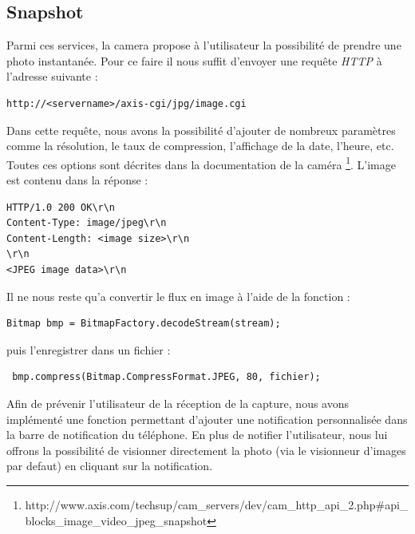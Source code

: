 \subsection{Snapshot}
Parmi ces services, la camera propose à l'utilisateur la possibilité de
prendre une photo instantanée. \newline
Pour ce faire il nous suffit d'envoyer une requête \textit{HTTP} à l'adresse
suivante : 
\begin{lstlisting}
http://<servername>/axis-cgi/jpg/image.cgi
\end{lstlisting}
Dans cette requête, nous avons la possibilité d'ajouter de nombreux paramètres
comme la résolution, le taux de compression, l'affichage de la date, l'heure,
etc. Toutes ces options sont décrites dans la documentation de la caméra
\footnote{\label{MjpegView}http://www.axis.com/techsup/cam\_servers/dev/cam\_http\_api\_2.php\#api\_blocks\_image\_video\_jpeg\_snapshot}.
L'image est contenu dans la réponse :
\begin{lstlisting}
HTTP/1.0 200 OK\r\n
Content-Type: image/jpeg\r\n
Content-Length: <image size>\r\n
\r\n
<JPEG image data>\r\n
\end{lstlisting}
Il ne nous reste qu'a convertir le flux en image
à l'aide de la fonction :
\begin{lstlisting}
Bitmap bmp = BitmapFactory.decodeStream(stream);
\end{lstlisting}
puis l'enregistrer dans un fichier :
\begin{lstlisting}
 bmp.compress(Bitmap.CompressFormat.JPEG, 80, fichier);
\end{lstlisting}
Afin de prévenir l'utilisateur de la réception de la capture, nous avons
implémenté une fonction permettant d'ajouter une notification personnalisée dans
la barre de notification du téléphone.\newline
En plus de notifier l'utilisateur, nous lui offrons la possibilité de visionner directement la photo (via le visionneur d'images par defaut) en cliquant sur la notification.
